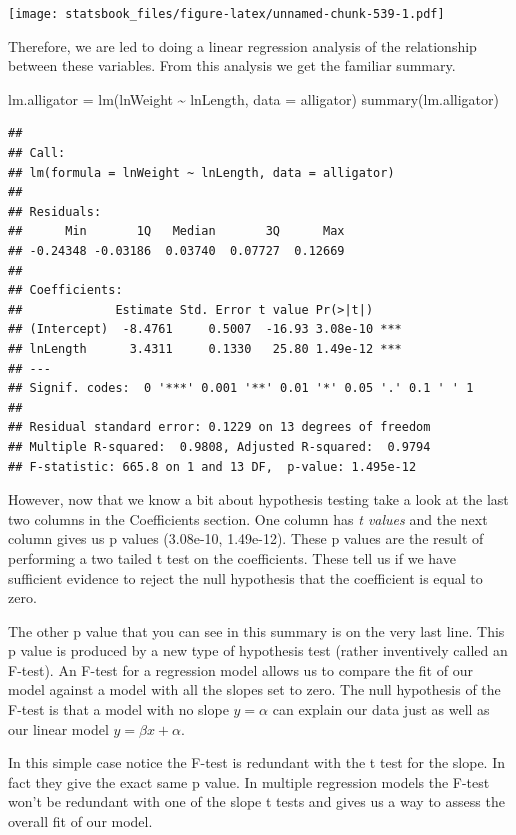 \documentclass[
]{book}
\newenvironment{Shaded}{\begin{snugshade}}{\end{snugshade}}
\newcommand{\AttributeTok}[1]{\textcolor[rgb]{0.77,0.63,0.00}{#1}}
\newcommand{\FunctionTok}[1]{\textcolor[rgb]{0.00,0.00,0.00}{#1}}
\newcommand{\NormalTok}[1]{#1}
\newcommand{\OtherTok}[1]{\textcolor[rgb]{0.56,0.35,0.01}{#1}}
\newcommand{\SpecialCharTok}[1]{\textcolor[rgb]{0.00,0.00,0.00}{#1}}
\theoremstyle{definition}
\theoremstyle{definition}
\theoremstyle{definition}
\theoremstyle{definition}
\theoremstyle{remark}
\begin{document}
\texttt{[image: statsbook\_files/figure-latex/unnamed-chunk-539-1.pdf]}

Therefore, we are led to doing a linear regression analysis of the relationship between these variables. From this analysis we get the familiar summary.

\begin{Shaded}
\begin{Highlighting}[]
\NormalTok{lm.alligator }\OtherTok{=} \FunctionTok{lm}\NormalTok{(lnWeight }\SpecialCharTok{\textasciitilde{}}\NormalTok{ lnLength, }\AttributeTok{data =}\NormalTok{ alligator)}
\FunctionTok{summary}\NormalTok{(lm.alligator)}
\end{Highlighting}
\end{Shaded}

\begin{verbatim}
## 
## Call:
## lm(formula = lnWeight ~ lnLength, data = alligator)
## 
## Residuals:
##      Min       1Q   Median       3Q      Max 
## -0.24348 -0.03186  0.03740  0.07727  0.12669 
## 
## Coefficients:
##             Estimate Std. Error t value Pr(>|t|)    
## (Intercept)  -8.4761     0.5007  -16.93 3.08e-10 ***
## lnLength      3.4311     0.1330   25.80 1.49e-12 ***
## ---
## Signif. codes:  0 '***' 0.001 '**' 0.01 '*' 0.05 '.' 0.1 ' ' 1
## 
## Residual standard error: 0.1229 on 13 degrees of freedom
## Multiple R-squared:  0.9808, Adjusted R-squared:  0.9794 
## F-statistic: 665.8 on 1 and 13 DF,  p-value: 1.495e-12
\end{verbatim}

However, now that we know a bit about hypothesis testing take a look at the last two columns in the Coefficients section. One column has \emph{t values} and the next column gives us p values (3.08e-10, 1.49e-12). These p values are the result of performing a two tailed t test on the coefficients. These tell us if we have sufficient evidence to reject the null hypothesis that the coefficient is equal to zero.

The other p value that you can see in this summary is on the very last line. This p value is produced by a new type of hypothesis test (rather inventively called an F-test). An F-test for a regression model allows us to compare the fit of our model against a model with all the slopes set to zero. The null hypothesis of the F-test is that a model with no slope \(y=\alpha\) can explain our data just as well as our linear model \(y=\beta x + \alpha\).

In this simple case notice the F-test is redundant with the t test for the slope. In fact they give the exact same p value. In multiple regression models the F-test won't be redundant with one of the slope t tests and gives us a way to assess the overall fit of our model.
\end{document}
